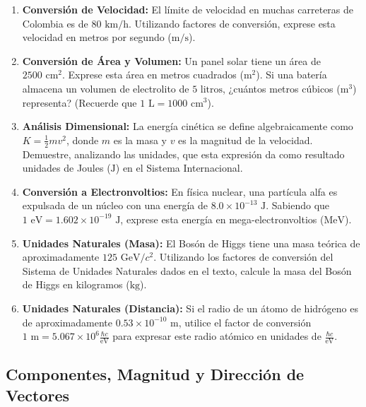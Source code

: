 \documentclass[11pt,a4paper]{book}
\begin{document}
\begin{enumerate}
    \item \textbf{Conversión de Velocidad:} El límite de velocidad en muchas carreteras de Colombia es de $80 \text{ km/h}$. Utilizando factores de conversión, exprese esta velocidad en metros por segundo ($\text{m/s}$).
    
    \item \textbf{Conversión de Área y Volumen:} Un panel solar tiene un área de $2500 \text{ cm}^2$. Exprese esta área en metros cuadrados ($\text{m}^2$). Si una batería almacena un volumen de electrolito de $5 \text{ litros}$, ¿cuántos metros cúbicos ($\text{m}^3$) representa? (Recuerde que $1 \text{ L} = 1000 \text{ cm}^3$).
    
    \item \textbf{Análisis Dimensional:} La energía cinética se define algebraicamente como $K = \frac{1}{2}mv^2$, donde $m$ es la masa y $v$ es la magnitud de la velocidad. Demuestre, analizando las unidades, que esta expresión da como resultado unidades de Joules ($\text{J}$) en el Sistema Internacional.
    
    \item \textbf{Conversión a Electronvoltios:} En física nuclear, una partícula alfa es expulsada de un núcleo con una energía de $8.0 \times 10^{-13} \text{ J}$. Sabiendo que $1 \text{ eV} = 1.602 \times 10^{-19} \text{ J}$, exprese esta energía en mega-electronvoltios ($\text{MeV}$).
    
    \item \textbf{Unidades Naturales (Masa):} El Bosón de Higgs tiene una masa teórica de aproximadamente $125 \text{ GeV}/c^2$. Utilizando los factores de conversión del Sistema de Unidades Naturales dados en el texto, calcule la masa del Bosón de Higgs en kilogramos ($\text{kg}$).
    
    \item \textbf{Unidades Naturales (Distancia):} Si el radio de un átomo de hidrógeno es de aproximadamente $0.53 \times 10^{-10} \text{ m}$, utilice el factor de conversión $1 \text{ m} = 5.067 \times 10^6 \frac{\hbar c}{\text{eV}}$ para expresar este radio atómico en unidades de $\frac{\hbar c}{\text{eV}}$.
\end{enumerate}

\subsection*{Componentes, Magnitud y Dirección de Vectores}
\end{document}
